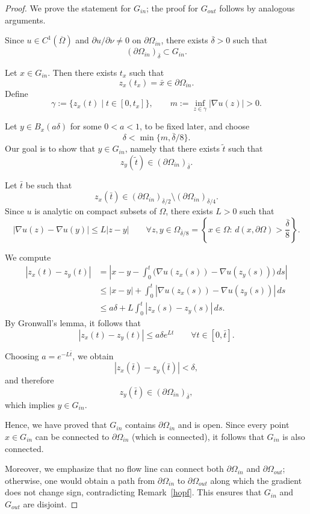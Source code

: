 \documentclass[oneside,a4paper,11pt,notitlepage]{article}
\theoremstyle{plain}
\numberwithin{teor}{section}
\numberwithin{equation}{section}
\theoremstyle{definition}
\theoremstyle{plain}
\theoremstyle{plain}
\theoremstyle{plain}
\theoremstyle{plain}
\theoremstyle{definition}
\theoremstyle{definition}
\theoremstyle{plain}
\begin{document}
\begin{proof}
We prove the statement for $G_{in}$; the proof for $G_{out}$ follows by analogous arguments.

Since $u \in C^{1}(\overline \Omega)$ and $\partial u / \partial \nu \neq 0$ on $\partial \Omega_{in}$, there exists $\overline{\delta} > 0$ such that
\[
(\partial \Omega_{in})_{\overline{\delta}} \subset G_{in}.
\]

Let $x \in G_{in}$. Then there exists $t_x$ such that
\[
z_x(t_x) = \bar{x} \in \partial \Omega_{in}.
\]
Define
\[
\gamma := \{ z_x(t) \mid t \in [0,t_x] \},
\qquad
m := \inf_{z \in \gamma} |\nabla u(z)| > 0.
\]

Let $y \in B_x(a\delta)$ for some $0 < a < 1$, to be fixed later, and choose
\[
\delta < \min \{ m, \overline{\delta}/8 \}.
\]
Our goal is to show that $y \in G_{in}$, namely that there exists $\tilde{t}$ such that
\[
z_y(\tilde {t}) \in (\partial \Omega_{in})_{\overline{\delta}}.
\]

Let $\bar{t}$ be such that
\[
z_x(\bar{t}) \in (\partial \Omega_{in})_{\overline{\delta}/2}
\setminus (\partial \Omega_{in})_{\overline{\delta}/4}.
\]
Since $u$ is analytic on compact subsets of $\Omega$, there exists $L > 0$ such that
\[
|\nabla u(z) - \nabla u(y)| \le L |z-y|
\qquad \forall z,y \in \Omega_{\overline{\delta}/8}= \left\{x \in \Omega : \, d (x, \partial \Omega )> \frac{\overline \delta
}{8}\right\}.
\]

We compute
\begin{align*}
|z_x(t) - z_y(t)|
&= \left| x - y - \int_0^t \bigl( \nabla u(z_x(s)) - \nabla u(z_y(s)) \bigr)\, ds \right| \\
&\le |x-y| + \int_0^t |\nabla u(z_x(s)) - \nabla u(z_y(s))|\, ds \\
&\le a\delta + L \int_0^t |z_x(s) - z_y(s)|\, ds.
\end{align*}
By Gronwall's lemma, it follows that
\[
|z_x(t) - z_y(t)| \le a \delta e^{Lt}
\qquad \forall t \in [0,\bar{t}].
\]

Choosing $a = e^{-L\bar{t}}$, we obtain
\[
|z_x(\bar{t}) - z_y(\bar{t})| < \delta,
\]
and therefore
\[
z_y(\bar{t}) \in (\partial \Omega_{in})_{\overline{\delta}},
\]
which implies $y \in G_{in}$.

Hence, we have proved that $G_{in}$ contains $\partial \Omega_{in}$ and is open. Since every point $x \in G_{in}$ can be connected to $\partial \Omega_{in}$ (which is connected), it follows that $G_{in}$ is also connected. 

Moreover, we emphasize that no flow line can connect both $\partial \Omega_{in}$ and $\partial \Omega_{out}$; otherwise, one would obtain a path from $\partial \Omega_{in}$ to $\partial \Omega_{out}$ along which the gradient does not change sign, contradicting Remark~\ref{hopf}. This ensures that $G_{in}$ and $G_{out}$ are disjoint.
\end{proof}
\end{document}
